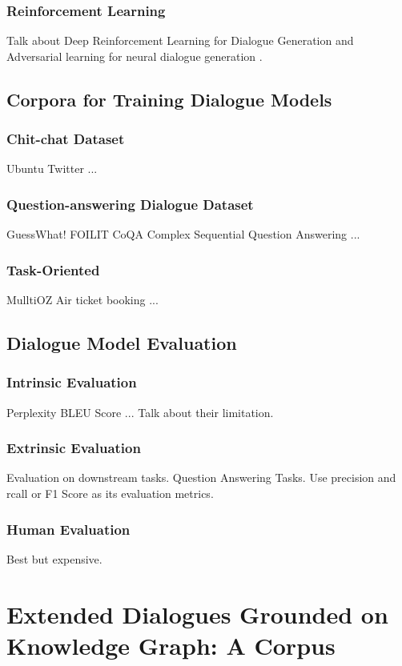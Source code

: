 \documentclass[bsc,frontabs,twoside,singlespacing,parskip,deptreport]{infthesis}     %
\begin{document}
\subsection{Reinforcement Learning}
Talk about Deep Reinforcement Learning for Dialogue Generation\cite{li2016deep} and Adversarial learning for neural dialogue generation \cite{li2017adversarial}.


\section{Corpora for Training Dialogue Models}
\subsection{Chit-chat Dataset}
Ubuntu
Twitter
...
\subsection{Question-answering Dialogue Dataset}
GuessWhat!
FOILIT
CoQA
Complex Sequential Question Answering\cite{saha2018complex}
...
\subsection{Task-Oriented}
MulltiOZ
Air ticket booking
...



\section{Dialogue Model Evaluation}
\subsection{Intrinsic Evaluation}
Perplexity
BLEU Score
...
Talk about their limitation.
\subsection{Extrinsic Evaluation}
Evaluation on downstream tasks.
Question Answering Tasks. Use precision and rcall or F1 Score as its evaluation metrics.

\subsection{Human Evaluation}
Best but expensive.



\chapter{Extended Dialogues Grounded on Knowledge Graph: A Corpus}
\end{document}

